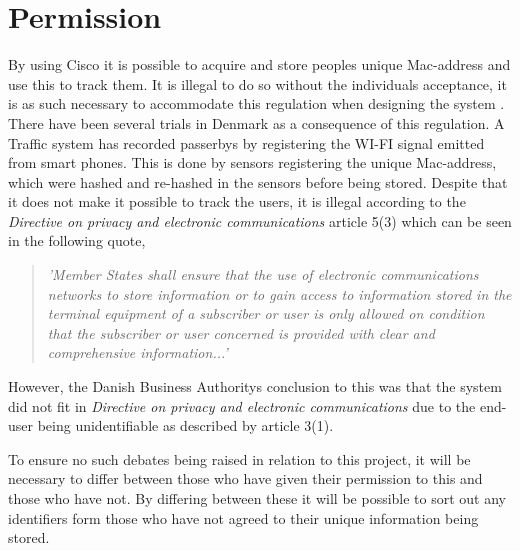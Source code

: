 \section{Permission} \label{sec:permission}
By using Cisco it is possible to acquire and store peoples unique Mac-address and use this to track them. It is illegal to do so without the individuals acceptance, it is as such necessary to accommodate this regulation when designing the system \cite{TrafficIlligal}.
There have been several trials in Denmark as a consequence of this regulation. A Traffic system has recorded passerbys by registering the WI-FI signal emitted from smart phones. This is done by sensors registering the unique Mac-address, which were hashed and re-hashed in the sensors before being stored. Despite that it does not make it possible to track the users\cite{TrafficIlligal}, it is illegal according to the \textit{Directive on privacy and electronic communications} article 5(3)\cite{CookieDirective} which can be seen in the following quote,

\begin{quote}
\textit{'Member States shall ensure that the use of electronic communications networks to store information or to gain access to information stored in the terminal equipment of a subscriber or user is only allowed on condition that the subscriber or user concerned is provided with clear and comprehensive information...'}
\end{quote}

However, the Danish Business Authoritys conclusion to this was that the system did not fit in \textit{Directive on privacy and electronic communications} due to the end-user being unidentifiable\cite{TrafficOK} as described by article 3(1)\cite{CookieDirective}.

To ensure no such debates being raised in relation to this project, it will be necessary to differ between those who have given their permission to this and those who have not. By differing between these it will be possible to sort out any identifiers form those who have not agreed to their unique information being stored.
